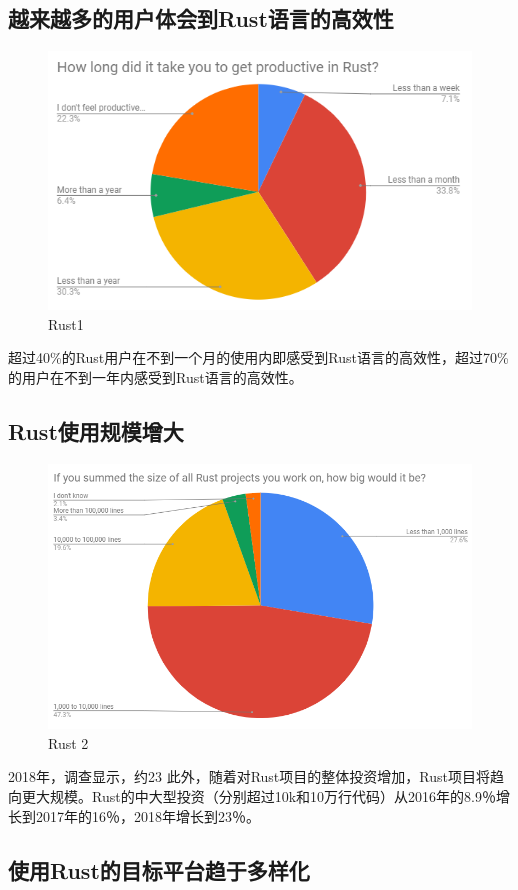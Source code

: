\documentclass[12pt, a4paper]{article}
\begin{document}
	\subsection{越来越多的用户体会到Rust语言的高效性}
	
\begin{figure}[H]
	\centering
	\includegraphics[width=0.7\linewidth]{n1}
	\caption{Rust1}
	\label{fig:n1}
\end{figure}
	超过40\%的Rust用户在不到一个月的使用内即感受到Rust语言的高效性，超过70\%的用户在不到一年内感受到Rust语言的高效性。   
	\subsection{Rust使用规模增大}
	
\begin{figure}[H]
	\centering
	\includegraphics[width=0.7\linewidth]{n2}
	\caption{Rust 2}
	\label{fig:n2}
\end{figure}
2018年，调查显示，约23%
此外，随着对Rust项目的整体投资增加，Rust项目将趋向更大规模。Rust的中大型投资（分别超过10k和10万行代码）从2016年的8.9％增长到2017年的16％，2018年增长到23％。    
	\subsection{使用Rust的目标平台趋于多样化}
	
\end{document}
